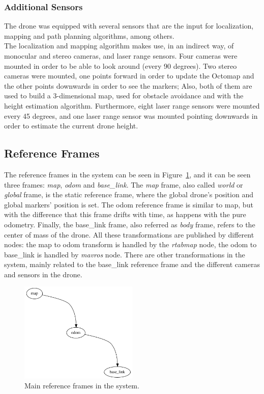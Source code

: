 \subsubsection{Additional Sensors}
The drone was equipped with several sensors that are the input for localization, mapping and path planning algorithms, among others.\\

The localization and mapping algorithm makes use, in an indirect way, of monocular and stereo cameras, and laser range sensors. Four cameras were mounted in order to be able to look around (every 90 degrees). Two stereo cameras were mounted, one points forward in order to update the Octomap and the other points downwards in order to see the markers; Also, both of them are used to build a 3-dimensional map, used for obstacle avoidance and with the height estimation algorithm. Furthermore, eight laser range sensors were mounted every 45 degrees, and one laser range sensor was mounted pointing downwards in order to estimate the current drone height.\\

\subsection{Reference Frames}
\label{subsec:chapter2:drone:frames}
The reference frames in the system can be seen in Figure~\ref{fig:chapter2:drone:frames:frames}, and it can be seen three frames: \emph{map}, \emph{odom} and \emph{base\_link}. The \emph{map} frame, also called \emph{world} or \emph{global} frame, is the static reference frame, where the global drone's position and global markers' position is set. The odom reference frame is similar to map, but with the difference that this frame drifts with time, as happens with the pure odometry. Finally, the base\_link frame, also referred as \emph{body} frame, refers to the center of mass of the drone. All these transformations are published by different nodes: the map to odom transform is handled by the \emph{rtabmap} node, the odom to base\_link is handled by \emph{mavros} node. There are other transformations in the system, mainly related to the base\_link reference frame and the different cameras and sensors in the drone. \\

\begin{figure}[h]
    \centering
    \includegraphics[width=0.5\textwidth]{Figures/fig5-frames.png}
    \caption{Main reference frames in the system.}
    \label{fig:chapter2:drone:frames:frames}
\end{figure}

